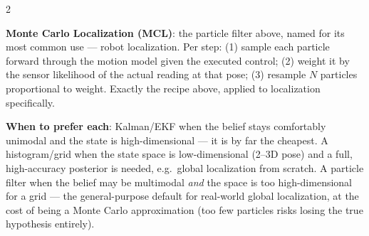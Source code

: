 \documentclass[10pt,a4paper]{article}
\newcommand{\keyterm}[1]{\textbf{#1}}
\begin{document}
\begin{multicols}{2}
\begin{notebox}
\keyterm{Monte Carlo Localization (MCL)}: the particle filter above, named for its most common use --- robot localization. Per step: (1) sample each particle forward through the motion model given the executed control; (2) weight it by the sensor likelihood of the actual reading at that pose; (3) resample $N$ particles proportional to weight. Exactly the recipe above, applied to localization specifically.
\end{notebox}
\begin{notebox}
\keyterm{When to prefer each}: Kalman/EKF when the belief stays comfortably unimodal and the state is high-dimensional --- it is by far the cheapest. A histogram/grid when the state space is low-dimensional (2--3D pose) and a full, high-accuracy posterior is needed, e.g.\ global localization from scratch. A particle filter when the belief may be multimodal \emph{and} the space is too high-dimensional for a grid --- the general-purpose default for real-world global localization, at the cost of being a Monte Carlo approximation (too few particles risks losing the true hypothesis entirely).
\end{notebox}


\end{multicols}
\end{document}
